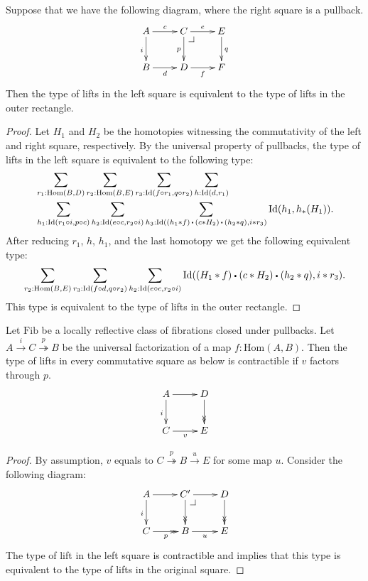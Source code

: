 \documentclass[reqno]{amsart}
\makeatletter
\theoremstyle{definition}
\theoremstyle{remark}
\newcommand{\fs}[1]{\mathrm{#1}}
\newcommand{\Hom}{\fs{Hom}}
\newcommand{\Id}{\fs{Id}}
\newcommand{\Fib}{\fs{Fib}}
\numberwithin{figure}{section}
\newcommand{\ct}{%
  \mathchoice{\mathbin{\raisebox{0.25ex}{$\displaystyle\centerdot$}}}%
             {\mathbin{\raisebox{0.25ex}{$\centerdot$}}}%
             {\mathbin{\raisebox{0.25ex}{$\scriptstyle\,\centerdot\,$}}}%
             {\mathbin{\raisebox{0.25ex}{$\scriptscriptstyle\,\centerdot\,$}}}
}
\newcommand{\pb}[1][dr]{\save*!/#1-1.2pc/#1:(-1,1)@^{|-}\restore}
\makeatother
\begin{document}
\begin{lem}
Suppose that we have the following diagram, where the right square is a pullback.
\[ \xymatrix{ A \ar[r]^{c} \ar[d]_i & C \ar[r]^e \ar[d]_p \pb   & E \ar[d]^q \\
              B \ar[r]_d            & D \ar[r]_f                & F
            } \]
Then the type of lifts in the left square is equivalent to the type of lifts in the outer rectangle.
\end{lem}
\begin{proof}
Let $H_1$ and $H_2$ be the homotopies witnessing the commutativity of the left and right square, respectively.
By the universal property of pullbacks, the type of lifts in the left square is equivalent to the following type:
\begin{align*}
& \sum_{r_1 : \Hom(B,D)} \sum_{r_2 : \Hom(B,E)} \sum_{r_3 : \Id(f \circ r_1, q \circ r_2)} \sum_{h : \Id(d,r_1)} \\
& \sum_{h_1 : \Id(r_1 \circ i, p \circ c)} \sum_{h_2 : \Id(e \circ c, r_2 \circ i)} \sum_{h_3 : \Id((h_1 * f) \ct (c * H_2) \ct (h_2 * q), i * r_3)} \Id(h_1,h_*(H_1)).
\end{align*}
After reducing $r_1$, $h$, $h_1$, and the last homotopy we get the following equivalent type:
\[ \sum_{r_2 : \Hom(B,E)} \sum_{r_3 : \Id(f \circ d, q \circ r_2)} \sum_{h_2 : \Id(e \circ c, r_2 \circ i)} \Id((H_1 * f) \ct (c * H_2) \ct (h_2 * q), i * r_3). \]
This type is equivalent to the type of lifts in the outer rectangle.
\end{proof}

\begin{lem}
Let $\Fib$ be a locally reflective class of fibrations closed under pullbacks.
Let $A \xrightarrow{i} C \overset{p}\twoheadrightarrow B$ be the universal factorization of a map $f : \Hom(A,B)$.
Then the type of lifts in every commutative square as below is contractible if $v$ factors through $p$.
\[ \xymatrix{ A \ar[r] \ar[d]_i & D \ar@{->>}[d] \\
              C \ar[r]_v        & E
            } \]
\end{lem}
\begin{proof}
By assumption, $v$ equals to $C \overset{p}\twoheadrightarrow B \xrightarrow{u} E$ for some map $u$.
Consider the following diagram:
\[ \xymatrix{ A \ar[r] \ar[d]_i & C' \ar[r] \ar@{->>}[d] \pb    & D \ar@{->>}[d] \\
              C \ar@{->>}[r]_p  & B \ar[r]_u                    & E
            } \]
The type of lift in the left square is contractible and  implies that this type is equivalent to the type of lifts in the original square.
\end{proof}
\end{document}
